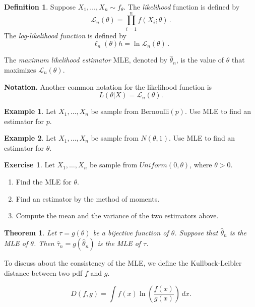 \documentclass[
  openany]{book}
\newtheorem{theorem}{Theorem}[chapter]
\theoremstyle{definition}
\newtheorem{definition}{Definition}[chapter]
\theoremstyle{definition}
\newtheorem{example}{Example}[chapter]
\theoremstyle{definition}
\newtheorem{exercise}{Exercise}[chapter]
\theoremstyle{definition}
\theoremstyle{remark}
\begin{document}
\begin{definition}
Suppose \(X_1, \dots, X_n \sim f_\theta\).
The \emph{likelihood} function is defined by
\[ \mathcal{L}_n(\theta) = \prod_{i = 1}^n f (X_i; \theta) \,. \]
The \emph{log-likelihood function} is defined by
\[ \ell_n (\theta) h = \ln \mathcal{L}_n (\theta) \,. \]

The \emph{maximum likelihood estimator} MLE, denoted by \(\hat \theta_n\), is the value of
\(\theta\) that maximizes \(\mathcal{L}_n(\theta)\).
\end{definition}

\textbf{Notation.} Another common notation for the likelihood function is
\[ L(\theta| X) = \mathcal{L}_n(\theta).\]

\begin{example}
Let \(X_1, \dots, X_n\) be sample from \(\mathrm{Bernoulli}(p)\).
Use MLE to find an estimator for \(p\).
\end{example}

\begin{example}
Let \(X_1, \dots, X_n\) be sample from \(N(\theta, 1)\).
Use MLE to find an estimator for \(\theta\).
\end{example}

\begin{exercise}

Let \(X_1, \dots, X_n\) be sample from \(Uniform(0,\theta)\), where \(\theta >0\).

\begin{enumerate}
\def\labelenumi{\arabic{enumi}.}
\item
  Find the MLE for \(\theta\).
\item
  Find an estimator by the method of moments.
\item
  Compute the mean and the variance of the two estimators above.
\end{enumerate}

\end{exercise}

\begin{theorem}
Let \(\tau = g(\theta)\) be a bijective function of \(\theta\).
Suppose that \(\hat \theta_n\) is the MLE of \(\theta\).
Then \(\hat \tau_n = g(\hat \theta_n)\) is the MLE of \(\tau\).
\end{theorem}

To discuss about the consistency of the MLE, we define the
Kullback-Leibler distance between two pdf \(f\) and \(g\).

\[ D(f,g) = \int f(x) \ln \left( \frac{f(x)}{g(x)} \right) \, dx.\]
\end{document}
